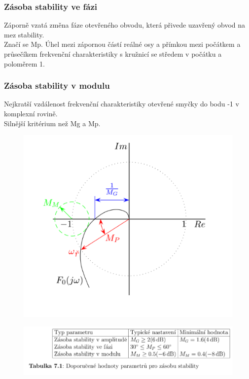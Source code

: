 \subsubsection*{Zásoba stability ve fázi}
Záporně vzatá změna fáze otevřeného obvodu, která přivede uzavřený obvod na mez stability.\\
Značí se Mp. Úhel mezi zápornou částí reálné osy a přímkou mezi počátkem a průsečíkem frekvenční charakteristiky s kružnicí se středem v počátku a poloměrem 1.\\

\subsubsection*{Zásoba stability v modulu}
Nejkratší vzdálenost frekvenční charakteristiky otevřené smyčky do bodu -1 v komplexní rovině.\\
Silnější kritérium než Mg a Mp.\\

\begin{figure}[H]
    \centering
    \includegraphics*[scale = 1.2]{images/zasobaStabiliity.png}
\end{figure}
\begin{figure}[H]
    \includegraphics*[scale = 1.1]{images/zasobaStabiliityTabulka.png}
\end{figure}


